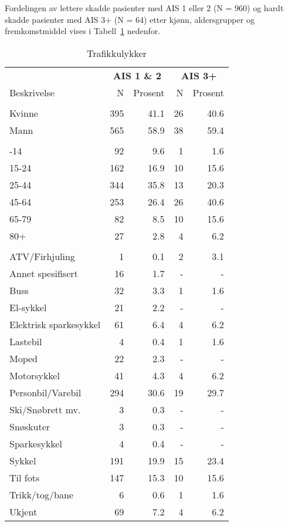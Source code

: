 \documentclass[
  letterpaper,
  DIV=11,
  numbers=noendperiod]{scrartcl}
\begin{document}
\endgroup

Fordelingen av lettere skadde pasienter med AIS 1 eller 2 (N = 960) og
hardt skadde pasienter med AIS 3+ (N = 64) etter kjønn, aldersgrupper og
fremkomstmiddel vises i Tabell~\ref{tbl-ais} nedenfor.

\begingroup
\fontsize{12.0pt}{14.4pt}\selectfont

\begin{longtable}{lrrrr}

\caption{\label{tbl-ais}Trafikkulykker}

\tabularnewline

\toprule
 & \multicolumn{2}{c}{\textbf{AIS 1 \& 2}} & \multicolumn{2}{c}{\textbf{AIS 3+}} \\ 
\cmidrule(lr){2-3} \cmidrule(lr){4-5}
Beskrivelse & N & Prosent & N & Prosent \\ 
\midrule\addlinespace[2.5pt]
\multicolumn{5}{l}{Kjønn} \\[2.5pt] 
\midrule\addlinespace[2.5pt]
Kvinne & 395 & 41.1 & 26 & 40.6 \\ 
Mann & 565 & 58.9 & 38 & 59.4 \\ 
\midrule\addlinespace[2.5pt]
\multicolumn{5}{l}{Alder} \\[2.5pt] 
\midrule\addlinespace[2.5pt]
0-14 & 92 & 9.6 & 1 & 1.6 \\ 
15-24 & 162 & 16.9 & 10 & 15.6 \\ 
25-44 & 344 & 35.8 & 13 & 20.3 \\ 
45-64 & 253 & 26.4 & 26 & 40.6 \\ 
65-79 & 82 & 8.5 & 10 & 15.6 \\ 
80+ & 27 & 2.8 & 4 & 6.2 \\ 
\midrule\addlinespace[2.5pt]
\multicolumn{5}{l}{Fremkomstmiddel} \\[2.5pt] 
\midrule\addlinespace[2.5pt]
ATV/Firhjuling & 1 & 0.1 & 2 & 3.1 \\ 
Annet spesifisert & 16 & 1.7 & - & - \\ 
Buss & 32 & 3.3 & 1 & 1.6 \\ 
El-sykkel & 21 & 2.2 & - & - \\ 
Elektrisk sparkesykkel & 61 & 6.4 & 4 & 6.2 \\ 
Lastebil & 4 & 0.4 & 1 & 1.6 \\ 
Moped & 22 & 2.3 & - & - \\ 
Motorsykkel & 41 & 4.3 & 4 & 6.2 \\ 
Personbil/Varebil & 294 & 30.6 & 19 & 29.7 \\ 
Ski/Snøbrett mv. & 3 & 0.3 & - & - \\ 
Snøskuter & 3 & 0.3 & - & - \\ 
Sparkesykkel & 4 & 0.4 & - & - \\ 
Sykkel & 191 & 19.9 & 15 & 23.4 \\ 
Til fots & 147 & 15.3 & 10 & 15.6 \\ 
Trikk/tog/bane & 6 & 0.6 & 1 & 1.6 \\ 
Ukjent & 69 & 7.2 & 4 & 6.2 \\ 
\bottomrule

\end{longtable}
\end{document}
